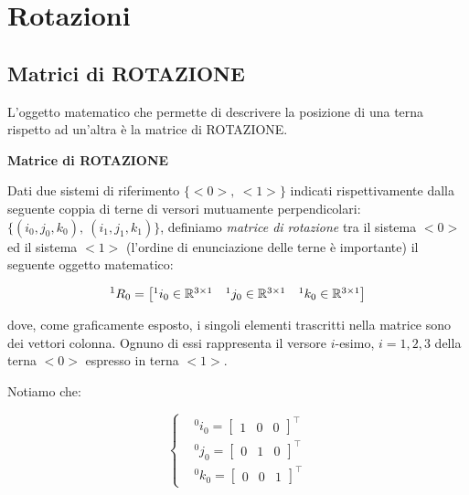 
\chapter{Rotazioni}
\label{cap:rot}

\section{Matrici di ROTAZIONE}

L'oggetto matematico che permette di descrivere la posizione di una terna rispetto ad un'altra è la matrice di ROTAZIONE.

\begin{defn}{\textbf{Matrice di ROTAZIONE}}

Dati due sistemi di riferimento $\{<0>,\ <1>\}$ indicati rispettivamente dalla seguente coppia di terne di versori mutuamente perpendicolari: $\{(i_0,j_0,k_0),\ (i_1,j_1,k_1)\}$, definiamo \textit{matrice di rotazione} tra il sistema $<0>$ ed il sistema $<1>$ (l'ordine di enunciazione delle terne è importante) il seguente oggetto matematico:

\[
	^1R_0 =
	\begin{bmatrix}^1i_0\in\mathbb{R}^{3\times 1}&^1j_0\in\mathbb{R}^{3\times 1}&^1k_0\in\mathbb{R}^{3\times 1}\end{bmatrix}
\]

dove, come graficamente esposto, i singoli elementi trascritti nella matrice sono dei vettori colonna. Ognuno di essi rappresenta il versore $i$-esimo, $i=1,2,3$ della terna $<0>$ espresso in terna $<1>$.

\end{defn}

Notiamo che:

\[
	\left\{
	\begin{aligned}
	&^0i_0 =  \begin{bmatrix}1&0&0\end{bmatrix}^\top\\
	&^0j_0 =  \begin{bmatrix}0&1&0\end{bmatrix}^\top\\
	&^0k_0 =  \begin{bmatrix}0&0&1\end{bmatrix}^\top
	\end{aligned}
	\right.
\]

